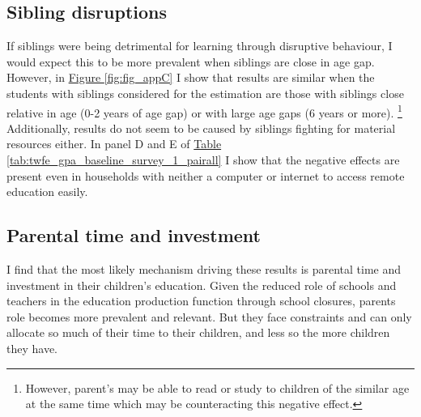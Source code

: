 \subsection{Sibling disruptions}

If siblings were being detrimental for learning through disruptive behaviour, I would expect this to be more prevalent when siblings are close in age gap. However, in \hyperref[fig:fig_appC]{Figure \ref{fig:fig_appC}} I show that results are similar when the students with siblings considered for the estimation are those with siblings close relative in age (0-2 years of age gap) or with large age gaps (6 years or more). \footnote{However, parent's may be able to read or study to children of the similar age at the same time which may be counteracting this negative effect.} Additionally, results do not seem to be caused by siblings fighting for material resources either. In panel D and E of \hyperref[tab:twfe_gpa_baseline_survey_1_pairall]{Table \ref{tab:twfe_gpa_baseline_survey_1_pairall}} I show that the negative effects are present even in households with neither a computer or internet to access remote education easily.





\subsection{Parental time and investment}

I find that the most likely mechanism driving these results is parental time and investment in their children's education. Given the reduced role of schools and teachers in the education production function through school closures, parents role becomes more prevalent and relevant. But they face constraints and can only allocate so much of their time to their children, and less so the more children they have.

